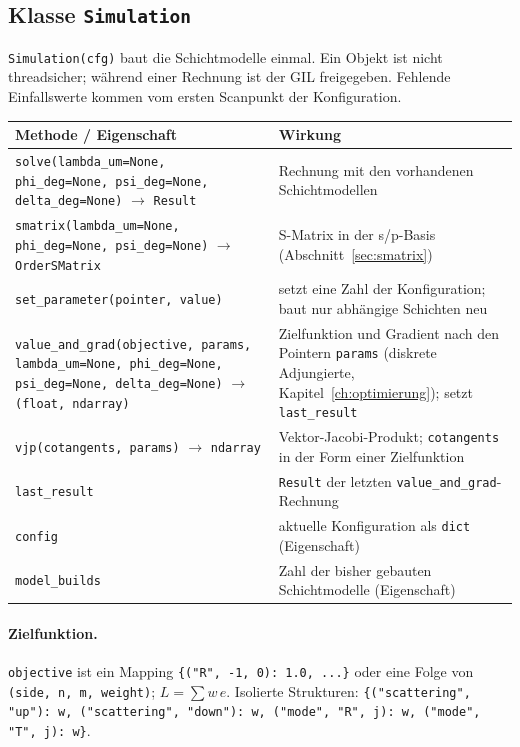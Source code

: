 \subsection{Klasse \texttt{Simulation}}
\texttt{Simulation(cfg)} baut die Schichtmodelle einmal. Ein Objekt ist nicht threadsicher; während einer Rechnung
ist der GIL freigegeben. Fehlende Einfallswerte kommen vom ersten Scanpunkt der Konfiguration.
\begin{center}
\small
\begin{longtable}{>{\raggedright\arraybackslash}p{6.4cm}>{\raggedright\arraybackslash}p{8.2cm}}
\toprule
Methode / Eigenschaft & Wirkung \\
\midrule
\endhead
\texttt{solve(lambda\_um=None, phi\_deg=None, psi\_deg=None, delta\_deg=None)} $\to$ \texttt{Result} & Rechnung mit
den vorhandenen Schichtmodellen \\
\texttt{smatrix(lambda\_um=None, phi\_deg=None, psi\_deg=None)} $\to$ \texttt{OrderSMatrix}%
\index{smatrix@\texttt{smatrix}} & S-Matrix in der s/p-Basis (Abschnitt~\ref{sec:smatrix}) \\
\texttt{set\_parameter(pointer, value)}\index{set_parameter@\texttt{set\_parameter}} & setzt eine Zahl der
Konfiguration; baut nur abhängige Schichten neu \\
\texttt{value\_and\_grad(objective, params, lambda\_um=None, phi\_deg=None, psi\_deg=None, delta\_deg=None)}
$\to$ \texttt{(float, ndarray)}\index{value_and_grad@\texttt{value\_and\_grad}} & Zielfunktion und Gradient nach den
Pointern \texttt{params} (diskrete Adjungierte, Kapitel~\ref{ch:optimierung}); setzt \texttt{last\_result} \\
\texttt{vjp(cotangents, params)} $\to$ \texttt{ndarray}\index{vjp@\texttt{vjp}} & Vektor-Jacobi-Produkt;
\texttt{cotangents} in der Form einer Zielfunktion \\
\texttt{last\_result}\index{last_result@\texttt{last\_result}} & \texttt{Result} der letzten
\texttt{value\_and\_grad}-Rechnung \\
\texttt{config}\index{config@\texttt{config}} & aktuelle Konfiguration als \texttt{dict} (Eigenschaft) \\
\texttt{model\_builds}\index{model_builds@\texttt{model\_builds}} & Zahl der bisher gebauten Schichtmodelle
(Eigenschaft) \\
\bottomrule
\end{longtable}
\end{center}
\paragraph{Zielfunktion.} \texttt{objective} ist ein Mapping \texttt{\{("R", -1, 0): 1.0, ...\}}
oder eine Folge von \texttt{(side, n, m, weight)}; $L=\sum w\,e$. Isolierte Strukturen:
\texttt{\{("scattering", "up"): w, ("scattering", "down"): w, ("mode", "R", j): w, ("mode", "T", j): w\}}.

